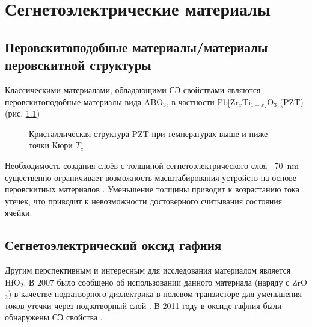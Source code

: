 \chapter{Сегнетоэлектрические материалы}\label{ch:ch2}
\section{Перовскитоподобные материалы/материалы перовскитной структуры}
Классическими материалами, обладающими СЭ свойствами являются перовскитоподобные материалы вида ABO\(_3\), в частности Pb[Zr\(_x\)Ti\(_{1-x}\)]O\(_3\) (PZT) (рис. \cref{fig:pzt})

\begin{figure}[ht]
    \caption{Кристаллическая структура PZT при температурах выше и ниже точки Кюри \(T_c\)}\label{fig:pzt}
\end{figure}

Необходимость создания слоёв с толщиной сегнетоэлектрического слоя \(~\) \SI{70}{\nano\meter} существенно ограничивает возможность масштабирования устройств на основе перовскитных материалов \cite{parkReviewPerspectiveFerroelectric2018}. Уменьшение толщины приводит к возрастанию тока утечек, что приводит к невозможности достоверного считывания состояния ячейки.
\section{Сегнетоэлектрический оксид гафния}\label{sec:ch2/sec1}
Другим перспективным и интересным для исследования материалом является HfO\(_2\). В 2007 было сообщено об использовании данного материала (наряду с ZrO\(_2\)) в качестве подзатворного диэлектрика в полевом транзисторе для уменьшения токов утечки через подзатворный слой \cite{bohrHighkSolution2007}. В 2011 году в оксиде гафния были обнаружены СЭ свойства \cite{bosckeFerroelectricityHafniumOxide2011}.

